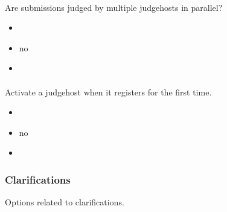 \documentclass[a4paper,10pt,english,openany]{sphinxmanual}
\begin{document}
\paragraph{}
\label{\detokenize{configuration-reference:enable-parallel-judging}}
\sphinxAtStartPar
Are submissions judged by multiple judgehosts in parallel?
\begin{itemize}
\item {} 
\sphinxAtStartPar
{} 

\item {} 
\sphinxAtStartPar
{} no

\item {} 
\sphinxAtStartPar
{} 

\end{itemize}


\paragraph{}
\label{\detokenize{configuration-reference:judgehost-activated-by-default}}
\sphinxAtStartPar
Activate a judgehost when it registers for the first time.
\begin{itemize}
\item {} 
\sphinxAtStartPar
{} 

\item {} 
\sphinxAtStartPar
{} no

\item {} 
\sphinxAtStartPar
{} 

\end{itemize}


\subsubsection{Clarifications}
\label{\detokenize{configuration-reference:clarifications}}
\sphinxAtStartPar
Options related to clarifications.
\end{document}
